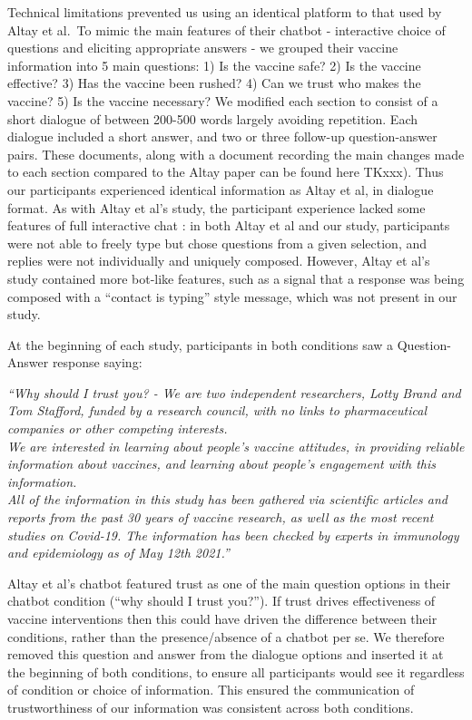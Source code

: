 \documentclass[english,,jou,floatsintext]{apa6}
\begin{document}
Technical limitations prevented us using an identical platform to that used by Altay et al.~To mimic the main features of their chatbot - interactive choice of questions and eliciting appropriate answers - we grouped their vaccine information into 5 main questions: 1) Is the vaccine safe? 2) Is the vaccine effective? 3) Has the vaccine been rushed? 4) Can we trust who makes the vaccine? 5) Is the vaccine necessary? We modified each section to consist of a short dialogue of between 200-500 words largely avoiding repetition. Each dialogue included a short answer, and two or three follow-up question-answer pairs. These documents, along with a document recording the main changes made to each section compared to the Altay paper can be found here TKxxx). Thus our participants experienced identical information as Altay et al, in dialogue format. As with Altay et al's study, the participant experience lacked some features of full interactive chat : in both Altay et al and our study, participants were not able to freely type but chose questions from a given selection, and replies were not individually and uniquely composed. However, Altay et al's study contained more bot-like features, such as a signal that a response was being composed with a \enquote{contact is typing} style message, which was not present in our study.

At the beginning of each study, participants in both conditions saw a Question-Answer response saying:

\emph{``Why should I trust you? - We are two independent researchers, Lotty Brand and Tom Stafford, funded by a research council, with no links to pharmaceutical companies or other competing interests. }\\
\emph{We are interested in learning about people's vaccine attitudes, in providing reliable information about vaccines, and learning about people's engagement with this information. }\\
\emph{All of the information in this study has been gathered via scientific articles and reports from the past 30 years of vaccine research, as well as the most recent studies on Covid-19. The information has been checked by experts in immunology and epidemiology as of May 12th 2021.''}

Altay et al's chatbot featured trust as one of the main question options in their chatbot condition (\enquote{why should I trust you?}). If trust drives effectiveness of vaccine interventions then this could have driven the difference between their conditions, rather than the presence/absence of a chatbot per se. We therefore removed this question and answer from the dialogue options and inserted it at the beginning of both conditions, to ensure all participants would see it regardless of condition or choice of information. This ensured the communication of trustworthiness of our information was consistent across both conditions.
\end{document}

